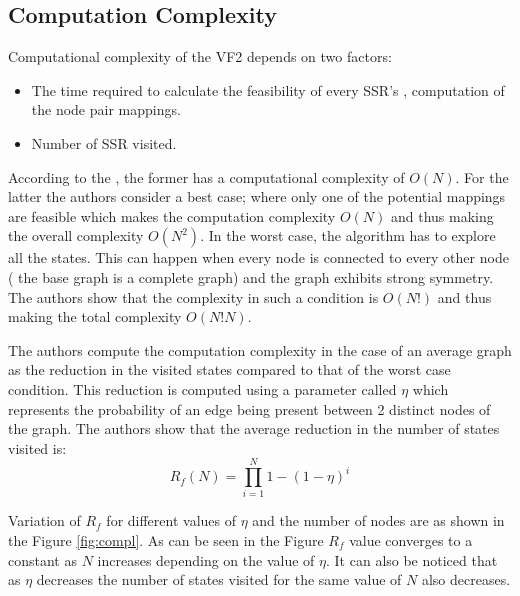 \subsection{Computation Complexity}
Computational complexity of the VF2 depends on two factors: 
\begin{itemize}
\item The time required to calculate the feasibility of every SSR's , computation of the node pair mappings.
\item Number of SSR visited.
\end{itemize}

According to the \citeauthor{cordella2001improved}, the former has a computational complexity of $O(N)$. For the latter the authors consider a best case; where only one of the potential mappings are feasible which makes the computation complexity $O(N)$ and thus making the overall complexity $O(N^2)$. In the worst case, the algorithm has to explore all the states. This can happen when every node is connected to every other node ( the base graph is a complete graph) and the graph exhibits strong symmetry. The authors show that the complexity in such a condition is $O(N!)$ and thus making the total complexity $O(N!N)$.

The authors compute the computation complexity in the case of an average graph as the reduction in the visited states compared to that of the worst case condition. This reduction is computed using a parameter called $\eta$ which represents the probability of an edge being present between 2 distinct nodes of the graph. The authors show that the average reduction in the number of states visited is:
\begin{equation*}
R_{f}(N) = \prod_{i=1}^{N} 1-(1-\eta)^{i}
\end{equation*}

 
 Variation of $R_f$ for different values of $\eta$ and the number of nodes are as shown in the Figure \ref{fig:compl}. As can be seen in the Figure $R_f$ value converges to a constant as $N$ increases depending on the value of $\eta$. It can also be noticed that as $\eta$ decreases the number of states visited for the same value of $N$ also decreases.
 
